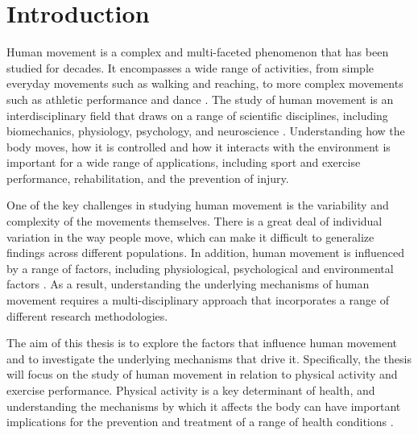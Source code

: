 \chapter{Introduction}\label{s:intro} \FloatBarrier

Human movement is a complex and multi-faceted phenomenon that has been studied for decades. It encompasses a wide range of activities, from simple everyday movements such as walking and reaching, to more complex movements such as athletic performance and dance \cite{pereira2017effect,tyler2016new}. The study of human movement is an interdisciplinary field that draws on a range of scientific disciplines, including biomechanics, physiology, psychology, and neuroscience \cite{boyd2017effects}. Understanding how the body moves, how it is controlled and how it interacts with the environment is important for a wide range of applications, including sport and exercise performance, rehabilitation, and the prevention of injury\cite{van2016neuroplasticity}.


One of the key challenges in studying human movement is the variability and complexity of the movements themselves\cite{miller2017predictors,muller2018physical,pereira2017effect}. There is a great deal of individual variation in the way people move, which can make it difficult to generalize findings across different populations. In addition, human movement is influenced by a range of factors, including physiological, psychological and environmental factors \cite{decre2016reliability,johnson2018influence}. As a result, understanding the underlying mechanisms of human movement requires a multi-disciplinary approach that incorporates a range of different research methodologies.

The aim of this thesis is to explore the factors that influence human movement and to investigate the underlying mechanisms that drive it. Specifically, the thesis will focus on the study of human movement in relation to physical activity and exercise performance. Physical activity is a key determinant of health, and understanding the mechanisms by which it affects the body can have important implications for the prevention and treatment of a range of health conditions \cite{lee2017exploring,maclellan2017quantifying,boyd2017effects}.


